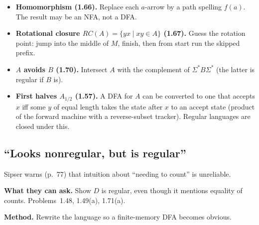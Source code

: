 \documentclass[11pt,a4paper]{article}
\begin{document}
\begin{itemize}
{        (1.45).} If $A$ is regular, $B$ arbitrary: from the DFA for
        $A$, a state $q$ is accepting in the new machine iff some
        string of $B$ takes $q$ to an old accept state. You do
        \emph{not} need $B$ to be regular to define $F'$, but
        computing $F'$ may be non-constructive if $B$ is arbitrary.
  \item \textbf{Homomorphism (1.66).} Replace each $a$-arrow by a
        path spelling $f(a)$. The result may be an NFA, not a DFA.
  \item \textbf{Rotational closure $RC(A)=\{yx\mid xy\in A\}$ (1.67).}
        Guess the rotation point: jump into the middle of $M$, finish,
        then from start run the skipped prefix.
  \item \textbf{$A$ avoids $B$ (1.70).} Intersect $A$ with the
        complement of $\Sigma^*B\Sigma^*$ (the latter is regular if
        $B$ is).
  \item \textbf{First halves $A_{1/2}$ (1.57).} A DFA for $A$ can
        be converted to one that accepts $x$ iff some $y$ of equal
        length takes the state after $x$ to an accept state
        (product of the forward machine with a reverse-subset
        tracker). Regular languages are closed under this.
\end{itemize}

\subsection{``Looks nonregular, but is regular''}

Sipser warns (p.~77) that intuition about ``needing to count'' is
unreliable.

\textbf{What they can ask.}
Show $D$ is regular, even though it mentions equality of counts.
Problems~1.48, 1.49(a), 1.71(a).

\textbf{Method.}
Rewrite the language so a finite-memory DFA becomes obvious.
\end{document}
